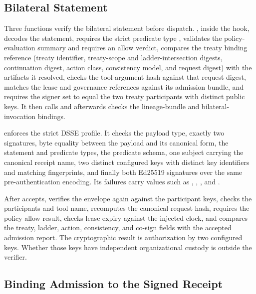 \subsection{Bilateral Statement}

Three functions verify the bilateral statement before dispatch.
, inside the hook, decodes the
statement, requires the strict predicate type
, validates the
policy-evaluation summary and requires an allow verdict, compares the treaty
binding reference (treaty identifier, treaty-scope and ladder-intersection
digests, continuation digest, action class, consistency model, and request
digest) with the artifacts it resolved, checks the tool-argument hash against
that request digest, matches the lease and governance references against its
admission bundle, and requires the signer set to equal the two treaty
participants with distinct public keys. It then calls
 and afterwards checks the
lineage-bundle and bilateral-invocation bindings.

 enforces the strict DSSE
profile. It checks the payload type, exactly two signatures, byte equality
between the payload and its canonical form, the statement and predicate types,
the predicate schema, one subject carrying the canonical receipt name, two
distinct configured keys with distinct key identifiers and matching
fingerprints, and finally both Ed25519 signatures over the same
pre-authentication encoding. Its failures carry
 values such as
, ,
, and
.

After  accepts,
 verifies the envelope
again against the participant keys, checks the participants and tool name,
recomputes the canonical request hash, requires the policy allow result,
checks lease expiry against the injected clock, and compares the treaty,
ladder, action, consistency, and co-sign fields with the accepted admission
report. The cryptographic result is authorization by two configured keys.
Whether those keys have independent organizational custody is outside the
verifier.

\subsection{Binding Admission to the Signed Receipt}

